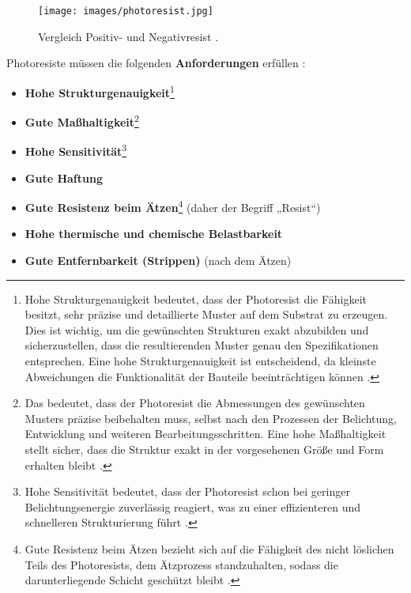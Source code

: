 \documentclass{article} %
\begin{document}
\begin{figure}[htb!]
    \centering
    \texttt{[image: images/photoresist.jpg]} %
    \captionsetup{labelfont=bf} %
    \caption{Vergleich Positiv- und Negativresist \cite{sciencedirect_photoresist}.}
    \label{fig:photoresist1}
\end{figure}

\vspace{1em}

Photoresiste müssen die folgenden \textbf{Anforderungen} erfüllen \cite{schmid2024}:

\begin{itemize}
    \item \textbf{Hohe Strukturgenauigkeit}\footnote{Hohe Strukturgenauigkeit bedeutet, dass der Photoresist die Fähigkeit besitzt, sehr präzise und detaillierte Muster auf dem Substrat zu erzeugen. Dies ist wichtig, um die gewünschten Strukturen exakt abzubilden und sicherzustellen, dass die resultierenden Muster genau den Spezifikationen entsprechen. Eine hohe Strukturgenauigkeit ist entscheidend, da kleinste Abweichungen die Funktionalität der Bauteile beeinträchtigen können \cite{madou2002, wolf2000, sciencedirect_photoresist}.}
    \item \textbf{Gute Maßhaltigkeit}\footnote{Das bedeutet, dass der Photoresist die Abmessungen des gewünschten Musters präzise beibehalten muss, selbst nach den Prozessen der Belichtung, Entwicklung und weiteren Bearbeitungsschritten. Eine hohe Maßhaltigkeit stellt sicher, dass die Struktur exakt in der vorgesehenen Größe und Form erhalten bleibt \cite{madou2002, wolf2000}.}
    \item \textbf{Hohe Sensitivität}\footnote{Hohe Sensitivität bedeutet, dass der Photoresist schon bei geringer Belichtungsenergie zuverlässig reagiert, was zu einer effizienteren und schnelleren Strukturierung führt \cite{madou2002, sciencedirect_photoresist}.}
    \item \textbf{Gute Haftung}
    \item \textbf{Gute Resistenz beim Ätzen}\footnote{Gute Resistenz beim Ätzen bezieht sich auf die Fähigkeit des nicht löslichen Teils des Photoresists, dem Ätzprozess standzuhalten, sodass die darunterliegende Schicht geschützt bleibt \cite{madou2002, wolf2000}.} (daher der Begriff „Resist“)
    \item \textbf{Hohe thermische und chemische Belastbarkeit}
    \item \textbf{Gute Entfernbarkeit (Strippen)} (nach dem Ätzen)
\end{itemize}
\end{document}
